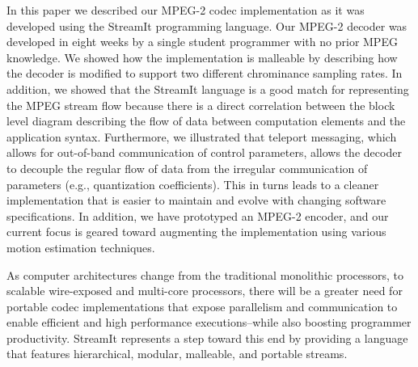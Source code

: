 
In this paper we described our MPEG-2 codec implementation as it was
developed using the StreamIt programming language. Our MPEG-2 decoder
was developed in eight weeks by a single student programmer with no
prior MPEG knowledge. We showed how the implementation is malleable by
describing how the decoder is modified to support two different chrominance
sampling rates. In addition, we showed that the StreamIt language is a
good match for representing the MPEG stream flow because there is a
direct correlation between the block level diagram describing the flow of
data between computation elements and the application
syntax. Furthermore, we illustrated that teleport messaging, which
allows for out-of-band communication of control parameters, allows the
decoder to decouple the regular flow of data from the irregular
communication of parameters (e.g., quantization
coefficients). This in turns leads to a cleaner implementation that is
easier to maintain and evolve with changing software specifications.
In addition, we have prototyped an MPEG-2 encoder, and our current
focus is geared toward augmenting the implementation using various
motion estimation techniques.

As computer architectures change from the traditional monolithic
processors, to scalable wire-exposed and multi-core processors, there
will be a greater need for portable codec implementations that expose
parallelism and communication to enable efficient and high performance
executions--while also boosting programmer productivity.  StreamIt
represents a step toward this end by providing a language that
features hierarchical, modular, malleable, and portable streams.
